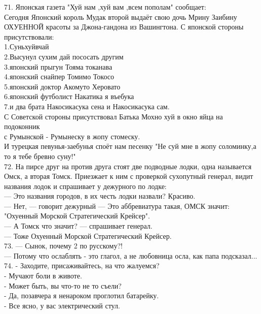 \documentclass[a4paper,20pt,notitlepage]{extbook}
\begin{document}
	71. Японская газета "Хуй нам ,хуй вам ,всем пополам" сообщает:\\
	Сегодня Японский король Мудак второй выдаёт свою дочь Мрину Заибину ОХУЕННОЙ красоты за Джона-гандона из Вашингтона.
	С японской стороны присутствовали:\\
	1.Суньхуйвчай\\
	2.Высунул сухим дай пососать другим\\
	3.японский прыгун Тояма токанава\\
	4.японский снайпер Томимо Токосо\\
	5.японский доктор Акомуто Херовато\\
	6.японский футболист Накатика я въебука\\
	7.и два брата
	Накосикасука сена и Накосикасука сам.\\
	С Советской стороны присутствовал Батька Мохно хуй в окно
	яйца на подоконник\\
	с Румынской - Румынеску в жопу стомеску.\\
	И турецкая певунья-заебунья споёт нам песенку "Не суй мне в жопу соломинку,а то я тебе бревно суну!"\\
	
	72. На пирсе друг на против друга стоят две подводные лодки, одна называется Омск, а вторая Томск.
	 Приезжает к ним с проверкой сухопутный генерал,
	видит названия лодок и спрашивает у дежурного по лодке:\\
	— Это названия городов, в их честь лодки назвали? Красиво.\\
	— Нет, — говорит дежурный — Это аббревиатура такая, ОМСК значит: "Охуенный Морской Стратегический Крейсер".\\
	— А Томск что значит? — спрашивает генерал.\\
	— Тоже Охуенный Морской Стратегический Крейсер.\\
	
	73. — ﻿﻿Сынок, почему 2 по русскому?!\\
	— ﻿Потому что ослаблять - это глагол, а не любовница осла, как папа подсказал...\\
	
	74.	- Заходите, присаживайтесь, на что жалуемся?\\
	- Мучают боли в животе.\\
	- Может быть, вы что-то не то съели?\\
	- Да, позавчера я ненароком проглотил батарейку.\\
	- Все ясно, у вас электрический стул.\\
	
\end{document}
